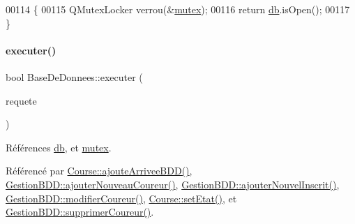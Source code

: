 \begin{DoxyCode}
00114 \{
00115     QMutexLocker verrou(&\hyperlink{class_base_de_donnees_aa1b4696fac87a740f914aa73739086f2}{mutex});
00116     \textcolor{keywordflow}{return} \hyperlink{class_base_de_donnees_a3e738dcf443370c46a541677ab619f06}{db}.isOpen();
00117 \}
\end{DoxyCode}
\mbox{\label{class_base_de_donnees_aa8de5f8f8bb17edc43f5c0ee33712081}} 
\paragraph{\texorpdfstring{executer()}{executer()}}
{\footnotesize\ttfamily bool Base\+De\+Donnees\+::executer (\begin{DoxyParamCaption}\item[{Q\+String}]{requete }\end{DoxyParamCaption})}



Références \hyperlink{class_base_de_donnees_a3e738dcf443370c46a541677ab619f06}{db}, et \hyperlink{class_base_de_donnees_aa1b4696fac87a740f914aa73739086f2}{mutex}.



Référencé par \hyperlink{class_course_ac99042bf8b20e8d3a54e72c8a80f7ee7}{Course\+::ajoute\+Arrivee\+B\+D\+D()}, \hyperlink{class_gestion_b_d_d_ae71561eea6d1163ff067f079ccc6d169}{Gestion\+B\+D\+D\+::ajouter\+Nouveau\+Coureur()}, \hyperlink{class_gestion_b_d_d_a71391d5419969b52cd999463b5326599}{Gestion\+B\+D\+D\+::ajouter\+Nouvel\+Inscrit()}, \hyperlink{class_gestion_b_d_d_afad096d7e405d35a818d4858ee34df61}{Gestion\+B\+D\+D\+::modifier\+Coureur()}, \hyperlink{class_course_a3ebcde1fa443cb20d71fb98af4d0c418}{Course\+::set\+Etat()}, et \hyperlink{class_gestion_b_d_d_afe47ec92274b7998131c5d4e6551d177}{Gestion\+B\+D\+D\+::supprimer\+Coureur()}.


